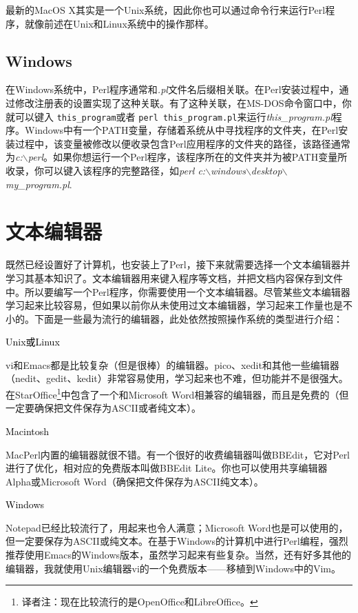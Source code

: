 最新的MacOS X其实是一个Unix系统，因此你也可以通过命令行来运行Perl程序，就像前述在Unix和Linux系统中的操作那样。

\subsection{Windows}
在Windows系统中，Perl程序通常和\textit{.pl}文件名后缀相关联。在Perl安装过程中，通过修改注册表的设置实现了这种关联。有了这种关联，在MS-DOS命令窗口中，你就可以键入 \verb|this_program|或者 \verb|perl this_program.pl|来运行\textit{this\_program.pl}程序。Windows中有一个PATH变量，存储着系统从中寻找程序的文件夹，在Perl安装过程中，该变量被修改以便收录包含Perl应用程序的文件夹的路径，该路径通常为\textit{c:$\backslash$perl}。如果你想运行一个Perl程序，该程序所在的文件夹并为被PATH变量所收录，你可以键入该程序的完整路径，如\textit{perl c:$\backslash$windows$\backslash$desktop$\backslash$my\_program.pl}.

\section{文本编辑器}
既然已经设置好了计算机，也安装上了Perl，接下来就需要选择一个文本编辑器并学习其基本知识了。文本编辑器用来键入程序等文档，并把文档内容保存到文件中。所以要编写一个Perl程序，你需要使用一个文本编辑器。尽管某些文本编辑器学习起来比较容易，但如果以前你从未使用过文本编辑器，学习起来工作量也是不小的。下面是一些最为流行的编辑器，此处依然按照操作系统的类型进行介绍：

\noindent
\textcolor{black}{Unix或Linux}
\begin{adjustwidth}{4em}{}
vi和Emacs都是比较复杂（但是很棒）的编辑器。pico、xedit和其他一些编辑器（nedit、gedit、kedit）非常容易使用，学习起来也不难，但功能并不是很强大。在StarOffice\footnote{译者注：现在比较流行的是OpenOffice和LibreOffice。}中包含了一个和Microsoft Word相兼容的编辑器，而且是免费的（但一定要确保把文件保存为ASCII或者纯文本）。
\end{adjustwidth}

\noindent
\textcolor{black}{Macintosh}
\begin{adjustwidth}{4em}{}
MacPerl内置的编辑器就很不错。有一个很好的收费编辑器叫做BBEdit，它对Perl进行了优化，相对应的免费版本叫做BBEdit Lite。你也可以使用共享编辑器Alpha或Microsoft Word（确保把文件保存为ASCII纯文本）。
\end{adjustwidth}

\noindent
\textcolor{black}{Windows}
\begin{adjustwidth}{4em}{}
Notepad已经比较流行了，用起来也令人满意；Microsoft Word也是可以使用的，但一定要保存为ASCII或纯文本。在基于Windows的计算机中进行Perl编程，强烈推荐使用Emacs的Windows版本，虽然学习起来有些复杂。当然，还有好多其他的编辑器，我就使用Unix编辑器vi的一个免费版本——移植到Windows中的Vim。
\end{adjustwidth}

